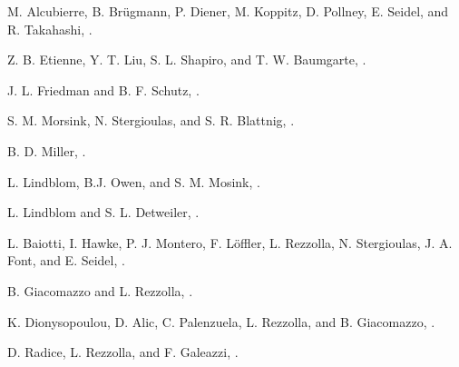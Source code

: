 M. Alcubierre, B. Br\"ugmann, P. Diener, M. Koppitz, D. Pollney, E. Seidel, and R. Takahashi, .


Z. B. Etienne, Y. T. Liu, S. L. Shapiro, and T. W. Baumgarte, .

J. L. Friedman and B. F. Schutz, .

S. M. Morsink, N. Stergioulas,  and S. R. Blattnig, .

B. D. Miller, .


L. Lindblom, B.J. Owen, and S. M. Mosink, .

L. Lindblom and S. L. Detweiler, .

L. Baiotti, I. Hawke, P. J. Montero, F. L\"offler, L. Rezzolla, N. Stergioulas, 
J. A. Font, and E. Seidel, .

B. Giacomazzo and L. Rezzolla, .

K. Dionysopoulou, D. Alic, C. Palenzuela, L. Rezzolla, and B. Giacomazzo, .

D. Radice, L. Rezzolla, and F. Galeazzi, .







